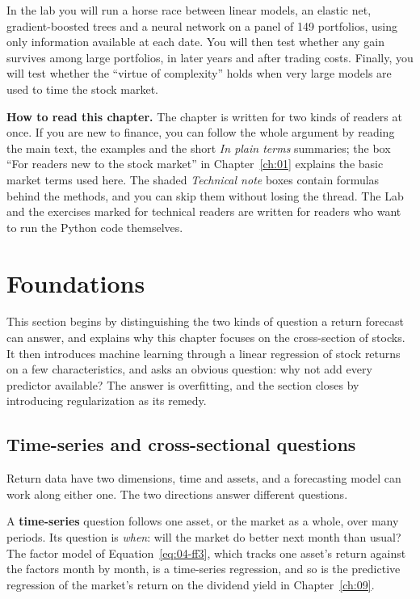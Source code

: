 In the lab you will run a horse race between linear models, an elastic net, gradient-boosted trees and a neural network on a panel of 149 portfolios, using only information available at each date. You will then test whether any gain survives among large portfolios, in later years and after trading costs. Finally, you will test whether the ``virtue of complexity'' holds when very large models are used to time the stock market.

\begin{callout}
\textbf{How to read this chapter.} The chapter is written for two kinds of readers at once. If you are new to finance, you can follow the whole argument by reading the main text, the examples and the short \emph{In plain terms} summaries; the box ``For readers new to the stock market'' in Chapter~\ref{ch:01} explains the basic market terms used here. The shaded \emph{Technical note} boxes contain formulas behind the methods, and you can skip them without losing the thread. The Lab and the exercises marked for technical readers are written for readers who want to run the Python code themselves.
\end{callout}

\section{Foundations}
\label{sec:20-foundations}

This section begins by distinguishing the two kinds of question a return forecast can answer, and explains why this chapter focuses on the cross-section of stocks. It then introduces machine learning through a linear regression of stock returns on a few characteristics, and asks an obvious question: why not add every predictor available? The answer is overfitting, and the section closes by introducing regularization as its remedy.

\subsection{Time-series and cross-sectional questions}
\label{sec:20-crosssection}

Return data have two dimensions, time and assets, and a forecasting model can work along either one. The two directions answer different questions.

A \textbf{time-series} question follows one asset, or the market as a whole, over many periods. Its question is \emph{when}: will the market do better next month than usual? The factor model of Equation~\eqref{eq:04-ff3}, which tracks one asset's return against the factors month by month, is a time-series regression, and so is the predictive regression of the market's return on the dividend yield in Chapter~\ref{ch:09}.

